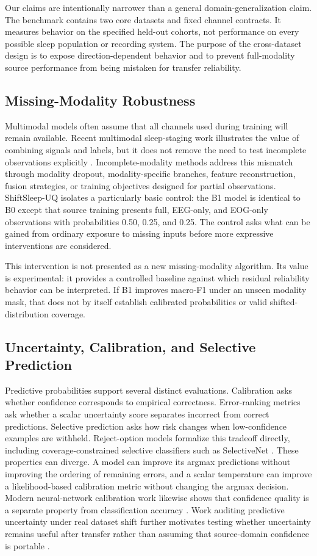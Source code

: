 \documentclass[11pt]{article}
\begin{document}
Our claims are intentionally narrower than a general domain-generalization claim. The benchmark contains two core datasets and fixed channel contracts. It measures behavior on the specified held-out cohorts, not performance on every possible sleep population or recording system. The purpose of the cross-dataset design is to expose direction-dependent behavior and to prevent full-modality source performance from being mistaken for transfer reliability.

\subsection{Missing-Modality Robustness}
Multimodal models often assume that all channels used during training will remain available. Recent multimodal sleep-staging work illustrates the value of combining signals and labels, but it does not remove the need to test incomplete observations explicitly \citep{yang2023sleepclip}. Incomplete-modality methods address this mismatch through modality dropout, modality-specific branches, feature reconstruction, fusion strategies, or training objectives designed for partial observations. ShiftSleep-UQ isolates a particularly basic control: the B1 model is identical to B0 except that source training presents full, EEG-only, and EOG-only observations with probabilities 0.50, 0.25, and 0.25. The control asks what can be gained from ordinary exposure to missing inputs before more expressive interventions are considered.

This intervention is not presented as a new missing-modality algorithm. Its value is experimental: it provides a controlled baseline against which residual reliability behavior can be interpreted. If B1 improves macro-F1 under an unseen modality mask, that does not by itself establish calibrated probabilities or valid shifted-distribution coverage.

\subsection{Uncertainty, Calibration, and Selective Prediction}
Predictive probabilities support several distinct evaluations. Calibration asks whether confidence corresponds to empirical correctness. Error-ranking metrics ask whether a scalar uncertainty score separates incorrect from correct predictions. Selective prediction asks how risk changes when low-confidence examples are withheld. Reject-option models formalize this tradeoff directly, including coverage-constrained selective classifiers such as SelectiveNet \citep{geifman2019selectivenet}. These properties can diverge. A model can improve its argmax predictions without improving the ordering of remaining errors, and a scalar temperature can improve a likelihood-based calibration metric without changing the argmax decision. Modern neural-network calibration work likewise shows that confidence quality is a separate property from classification accuracy \citep{guo2017calibration}. Work auditing predictive uncertainty under real dataset shift further motivates testing whether uncertainty remains useful after transfer rather than assuming that source-domain confidence is portable \citep{thagaard2020uncertaintyshift,prinster2022jaws}.
\end{document}

